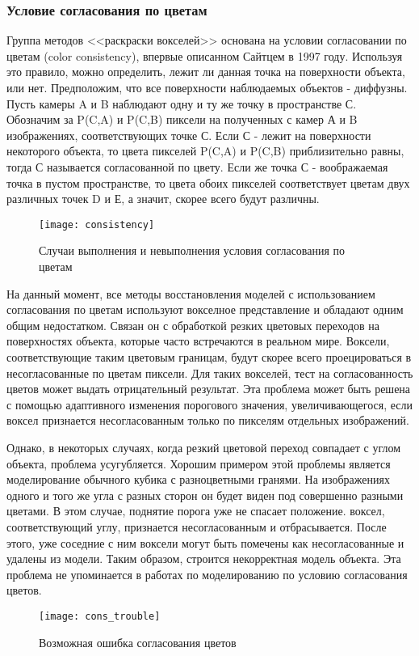 \subsubsection{Условие согласования по цветам}
Группа методов <<раскраски вокселей>> основана на условии согласовании по цветам (color consistency), впервые описанном Сайтцем в 1997 году. Используя это правило, можно определить, лежит ли данная точка на поверхности объекта, или нет. Предположим, что все поверхности наблюдаемых объектов - диффузны. Пусть камеры A и B наблюдают одну и ту же точку в пространстве С. Обозначим за P(C,A) и P(C,B) пиксели на полученных с камер А и B изображениях, соответствующих точке С. Если С - лежит на поверхности некоторого объекта, то цвета пикселей P(C,A) и P(C,B) приблизительно равны, тогда С называется согласованной по цвету. Если же точка С - воображаемая точка в пустом пространстве, то цвета обоих пикселей соответствует цветам двух различных точек D и Е, а значит, скорее всего будут различны. 
\begin{figure}[h]
\center
\texttt{[image: consistency]}
\caption{Случаи выполнения и невыполнения условия согласования по цветам}
\end{figure}

На данный момент, все методы восстановления моделей с использованием согласования по цветам используют вокселное представление и обладают одним общим недостатком. Связан он с обработкой резких цветовых переходов на поверхностях объекта, которые часто встречаются в реальном мире. Воксели, соответствующие таким цветовым границам, будут скорее всего проецироваться в несогласованные по цветам пиксели. Для таких вокселей, тест на согласованность цветов может выдать отрицательный результат. Эта проблема может быть решена с помощью адаптивного изменения порогового значения, увеличивающегося, если воксел признается несогласованным только по пикселям отдельных изображений.

Однако, в некоторых случаях, когда резкий цветовой переход совпадает с углом объекта, проблема усугубляется. Хорошим примером этой проблемы является моделирование обычного кубика с разноцветными гранями. На изображениях одного и того же угла с разных сторон он будет виден под совершенно разными цветами. В этом случае, поднятие порога уже не спасает положение. воксел, соответствующий углу, признается несогласованным и отбрасывается. После этого, уже соседние с ним воксели могут быть помечены как несогласованные и удалены из модели. Таким образом, строится некорректная модель объекта. Эта проблема не упоминается в работах по моделированию по условию согласования цветов.
\begin{figure}[h]
\center
\texttt{[image: cons\_trouble]}
\caption{Возможная ошибка согласования цветов}
\end{figure}

